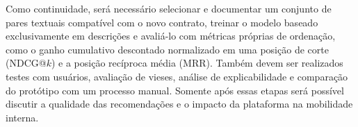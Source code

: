 \documentclass[12pt]{article}
\begin{document}
Como continuidade, será necessário selecionar e documentar um conjunto de pares textuais compatível com o novo contrato, treinar o modelo baseado exclusivamente em descrições e avaliá-lo com métricas próprias de ordenação, como o ganho cumulativo descontado normalizado em uma posição de corte (NDCG@$k$) e a posição recíproca média (MRR). Também devem ser realizados testes com usuários, avaliação de vieses, análise de explicabilidade e comparação do protótipo com um processo manual. Somente após essas etapas será possível discutir a qualidade das recomendações e o impacto da plataforma na mobilidade interna.



\end{document}
